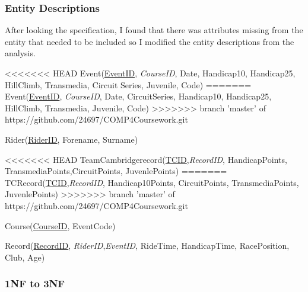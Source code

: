 \subsubsection{Entity Descriptions}
After looking the specification, I found that there was attributes missing from the entity that needed to be included so I modified the entity descriptions from the analysis.

<<<<<<< HEAD
Event(\underline{EventID}, \emph{CourseID}, Date, Handicap10, Handicap25, HillClimb, Transmedia, Circuit Series, Juvenile, Code)
=======
Event(\underline{EventID}, \emph{CourseID}, Date, CircuitSeries, Handicap10, Handicap25, HillClimb, Transmedia, Juvenile, Code)
>>>>>>> branch 'master' of https://github.com/24697/COMP4Coursework.git

Rider(\underline{RiderID}, Forename, Surname)

<<<<<<< HEAD
TeamCambridgerecord(\underline{TCID},\emph{RecordID}, HandicapPoints, TransmediaPoints,CircuitPoints, JuvenlePoints)
=======
TCRecord(\underline{TCID},\emph{RecordID}, Handicap10Points, CircuitPoints, TransmediaPoints, JuvenlePoints)
>>>>>>> branch 'master' of https://github.com/24697/COMP4Coursework.git

Course(\underline{CourseID}, EventCode)

Record(\underline{RecordID}, \emph{RiderID},\emph{EventID}, RideTime, HandicapTime, RacePosition, Club, Age)

\subsubsection{1NF to 3NF}



